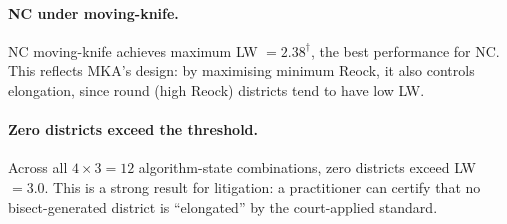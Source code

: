 \paragraph{NC under moving-knife.}
NC moving-knife achieves maximum LW $= 2.38^\dagger$, the best performance
for NC. This reflects MKA's design: by maximising minimum Reock, it also
controls elongation, since round (high Reock) districts tend to have low LW.

\paragraph{Zero districts exceed the threshold.}
Across all $4 \times 3 = 12$ algorithm-state combinations, zero districts
exceed LW $= 3.0$. This is a strong result for litigation: a practitioner
can certify that no bisect-generated district is ``elongated'' by the
court-applied standard.
